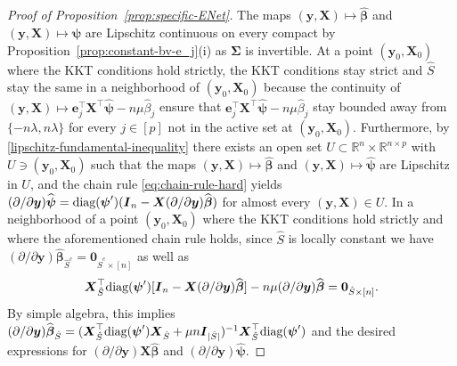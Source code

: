 \documentclass[11pt]{amsart}
\numberwithin{equation}{section}
\numberwithin{equation}{section}
\def\real{{\mathbb{R}}}
\def\R{{\real}}
\def\diag{\hbox{\rm diag}}
\def\mathbold{\boldsymbol} %
\def\bI{\mathbold{I}}\def\hbI{{\widehat{\bI}}}\def\tbI{{\widetilde{\bI}}}
\def\be{\mathbold{e}}
\def\bX{\mathbold{X}}\def\hbX{{\widehat{\bX}}}\def\tbX{{\widetilde{\bX}}}\def\bXbar{{\overline \bX}}
\def\by{\mathbold{y}}\def\yhat{\widehat{y}}\def\ytil{\widetilde{y}}\def\ybar{{\overline y}}\def\vby{{\bf y}}
\def\bbeta{\mathbold{\beta}}\def\betahat{\widehat{\beta}}\def\hbeta{\widehat{\beta}}
\def\hbbeta{{{\widehat{\bbeta}}}}
\def\bSigma{\mathbold{\Sigma}}\def\hbSigma{{\widehat{\bSigma}}}
\def\bpsi{\mathbold{\psi}}\def\psihat{\widehat{\psi}}\def\hpsi{\widehat{\psi}}
\def\hbpsi{{\widehat{\bpsi}}}\def\tbpsi{{\widetilde{\bpsi}}}
\begin{document}
\begin{proof}[Proof of Proposition~\ref{prop:specific-ENet}]
    The maps $(\by,\bX)\mapsto\hbbeta$ and $(\by,\bX)\mapsto \hbpsi$
    are Lipschitz continuous on every compact
    by Proposition~\ref{prop:constant-bv-e_j}(i) as $\bSigma$ is invertible.
    At a point $(\by_0,\bX_0)$ where the KKT conditions hold
    strictly, the KKT conditions stay strict and $\hat S$
    stay the same in a neighborhood of $(\by_0,\bX_0)$
    because the continuity of 
    $(\by,\bX) \mapsto \be_j^\top\bX^\top \hbpsi - n \mu\hbeta_j$
    ensure that $\be_j^\top\bX^\top \hbpsi - n \mu\hbeta_j$
    stay bounded away from $\{-n\lambda, n\lambda\}$
    for every $j\in[p]$ not in the active set at $(\by_0,\bX_0)$.
    Furthermore,
    by \eqref{lipschitz-fundamental-inequality} there exists an open
    set $U\subset \R^n\times \R^{n\times p}$
    with $U\ni(\by_0,\bX_0)$ such that the maps $(\by,\bX)\mapsto\hbbeta$
    and $(\by,\bX)\mapsto \hbpsi$ are Lipschitz in $U$, and
    the chain rule
    \eqref{eq:chain-rule-hard}
    yields
    $(\partial/\partial\by)\hbpsi
    =
    \diag(\bpsi')(\bI_n - \bX(\partial/\partial\by)\hbbeta)
    $ for almost every $(\by,\bX) \in U$.
    In a neighborhood of a point $(\by_0,\bX_0)$ where the KKT conditions
    hold strictly and where the aforementioned chain rule holds,
    since $\hat S$ is locally constant we have
    $(\partial/\partial\by) \hbbeta_{\hat S^c} = \mathbf{0}_{\hat S^c\times [n]}$
    as well as
    $$\bX_{\hat S}^\top\diag(\bpsi')[\bI_n -\bX(\partial/\partial \by)\hbbeta]
    - n \mu (\partial/\partial \by)\hbbeta
    = \mathbf{0}_{\hat S\times [n]}.$$
    By simple algebra, this implies
    $(\partial/\partial \by)\hbbeta_{\hat S}
    = (\bX_{\hat S}^\top\diag(\bpsi') \bX_{\hat S} + \mu n\bI_{|\hat S|})^{-1}
    \bX_{\hat S}^\top \diag(\bpsi')
    $ and the desired expressions for
    $(\partial/\partial\by)\bX\hbbeta$
    and
    $(\partial/\partial\by)\hbpsi$.

\end{proof}
\end{document}

